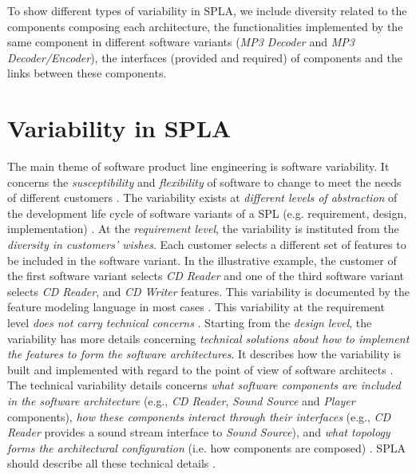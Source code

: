 \documentclass[graybox]{svmult}
\begin{document}
To show different types of variability in SPLA, we include diversity related to the components composing each architecture, the functionalities implemented by the same component in different software variants (\textit{MP3 Decoder} and \textit{MP3 Decoder/Encoder}), the interfaces (provided and required) of components and the links between these components.



\section{Variability in SPLA}
\label{sec:variability-spla}



The main theme of software product line engineering is software variability. It concerns the \textit{susceptibility} and \textit{flexibility} of software to change to meet the needs of different customers \cite{1_clements2002}. The variability exists at \textit{different levels of abstraction} of the development life cycle of software variants of a SPL (e.g. requirement, design, implementation) \cite{1_clements2002}.
At the \textit{requirement level}, the variability is instituted from the \textit{diversity in customers' wishes}. Each customer selects a different set of features to be included in the software variant. In the illustrative example, the customer of the first software variant selects \textit{CD Reader} and one of the third software variant selects \textit{CD Reader}, and \textit{CD Writer} features. This variability is documented by the feature modeling language in most cases \cite{7_kang1990feature}.  This variability at the requirement level \textit{does not carry technical concerns} \cite{3_pohl2005software}.  Starting from the\textit{ design level}, the variability has more details concerning \textit{technical solutions about how to implement the features to form the software architectures}. It describes how the variability is built and implemented with regard to the point of view of software architects \cite{3_pohl2005software}. The technical variability details concerns \textit{what software components are included in the software architecture} (e.g., \textit{CD Reader}, \textit{Sound Source} and \textit{Player} components), \textit{how these components interact through their interfaces} (e.g., \textit{CD Reader} provides a sound stream interface to \textit{Sound Source}), and \textit{what topology forms the architectural configuration} (i.e. how components are composed) \cite{nakagawa2011reference}. SPLA should describe all these technical details \cite{shatnawi2017recovering}. 
\end{document}

